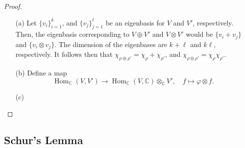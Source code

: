 \documentclass[a4paper]{report}
\theoremstyle{definition}
\theoremstyle{remark}
\theoremstyle{proposition}
\theoremstyle{conjecture}
\theoremstyle{lemma}
\theoremstyle{corollary}
\theoremstyle{exercise}
\theoremstyle{example}
\newcommand{\C}{\mathbb{C}}
\newcommand{\on}{\operatorname}
\begin{document}
\begin{proof}
    \leavevmode 
    \begin{itemize}
        \item[(a)] Let $\lbrace v_i\rbrace_{i=1}^k$, and 
            $\lbrace v_j \rbrace_{j=1}^\ell$ be an eigenbasis for 
            $V$ and $V'$, respectively. Then, the eigenbasis 
            corresponding to $V\oplus V'$ and $V\otimes V'$ would be 
            $\lbrace v_i + v_j\rbrace$ and $\lbrace v_i\otimes v_j\rbrace$. 
            The dimension of the eigenbases are $k+\ell$ and $k\ell$, 
            respectively. It follows then that 
            $\chi_{\rho\oplus \rho'} = \chi_\rho + \chi_{\rho'}$, and 
            $\chi_{\rho\otimes\rho'} = \chi_\rho \chi_{\rho'}$.
        \item[(b)] Define a map 
            $$\on{Hom}_\C(V,V') \longrightarrow \on{Hom}_\C(V,\C) \otimes_\C V',\quad f \longmapsto \varphi \otimes f.$$
        \item[(c)] 
    \end{itemize}
\end{proof}

\subsection{Schur's Lemma}
\end{document}
